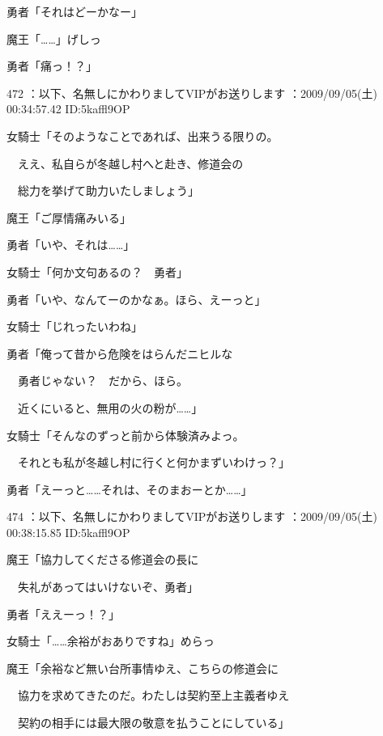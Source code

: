 \documentclass[a4j,twocolumn]{tarticle}
\begin{document}
勇者「それはどーかなー」\par{} 
魔王「……」げしっ\par{} 
勇者「痛っ！？」 

	
    
    

472 ：以下、名無しにかわりましてVIPがお送りします ：2009/09/05(土) 00:34:57.42 ID:5kaffl9OP 


女騎士「そのようなことであれば、出来うる限りの。\par{} 
　ええ、私自らが冬越し村へと赴き、修道会の\par{} 
　総力を挙げて助力いたしましょう」 



魔王「ご厚情痛みいる」\par{} 
勇者「いや、それは……」 



女騎士「何か文句あるの？　勇者」 



勇者「いや、なんてーのかなぁ。ほら、えーっと」\par{} 
女騎士「じれったいわね」



勇者「俺って昔から危険をはらんだニヒルな\par{} 
　勇者じゃない？　だから、ほら。\par{} 
　近くにいると、無用の火の粉が……」 



女騎士「そんなのずっと前から体験済みよっ。\par{} 
　それとも私が冬越し村に行くと何かまずいわけっ？」 



勇者「えーっと……それは、そのまおーとか……」 

	
    
    

474 ：以下、名無しにかわりましてVIPがお送りします ：2009/09/05(土) 00:38:15.85 ID:5kaffl9OP 


魔王「協力してくださる修道会の長に\par{} 
　失礼があってはいけないぞ、勇者」 



勇者「ええーっ！？」 



女騎士「……余裕がおありですね」めらっ 



魔王「余裕など無い台所事情ゆえ、こちらの修道会に\par{} 
　協力を求めてきたのだ。わたしは契約至上主義者ゆえ\par{} 
　契約の相手には最大限の敬意を払うことにしている」 
\end{document}

